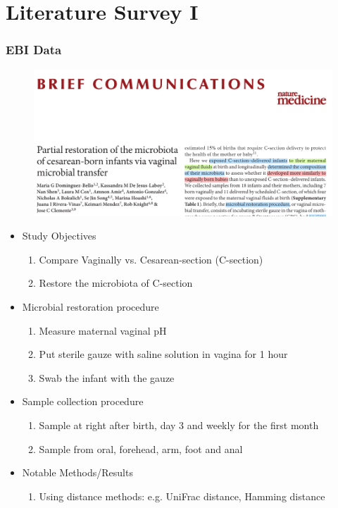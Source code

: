 \documentclass{beamer}
\begin{document}
    \section{Literature Survey I \protect \cite{validate1}}
    \begin{frame}[allowframebreaks]
        \frametitle{EBI Data}

        \begin{figure}
            \includegraphics[width=0.8 \linewidth]{figures/Literature/EBI/title.png}
        \end{figure}
        \newpage

        \begin{itemize}
            \item Study Objectives
            \begin{enumerate}
                \item Compare Vaginally vs. Cesarean-section (C-section)
                \item Restore the microbiota of C-section
            \end{enumerate}

            \item Microbial restoration procedure
            \begin{enumerate}
                \item Measure maternal vaginal pH
                \item Put sterile gauze with saline solution in vagina for 1 hour
                \item Swab the infant with the gauze
            \end{enumerate}

            \item Sample collection procedure
            \begin{enumerate}
                \item Sample at right after birth, day 3 and weekly for the first month
                \item Sample from oral, forehead, arm, foot and anal
            \end{enumerate}

            \item Notable Methods/Results
            \begin{enumerate}
                \item Using distance methods: e.g. UniFrac distance, Hamming distance
            \end{enumerate}
        \end{itemize}
    \end{frame}
\end{document}
